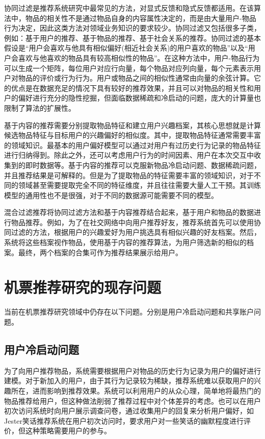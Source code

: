 协同过滤是推荐系统研究中最常见的方法，对显式反馈和隐式反馈都适用。在该算法中，物品的相关性不是通过物品自身的内容属性决定的，而是由大量用户-物品行为决定，因此这类方法对领域业务知识的要求较少。协同过滤又包括很多子类，例如：基于用户的推荐\cite{babu2011implementation}、基于物品的推荐\cite{sarwar2001item,linden2003amazon}、基于社会关系的推荐\cite{asabere2015socially,massa2007trust}。协同过滤的基本假设是“用户会喜欢与他具有相似偏好(相近社会关系)的用户喜欢的物品”以及“用户会喜欢与他喜欢的物品具有较高相似性的物品”。在这种方法中，用户-物品行为可以生成一个矩阵，每位用户对应行向量，每个物品对应列向量，每个元素表示用户对物品的评价或行为行为。用户或物品之间的相似性通常由向量的余弦\cite{goshtasby2012similarity}计算。它的优点是在数据充足的情况下具有较好的推荐效果，并且可以对物品的相关性和用户的偏好进行充分的隐性挖掘，但面临数据稀疏和冷启动的问题，庞大的计算量也限制了算法的扩展性。
		
基于内容的推荐需要分别提取物品特征和建立用户兴趣档案，其核心思想就是计算候选物品特征与目标用户的兴趣偏好的相似度。其中，提取物品特征通常需要丰富的领域知识。最基本的用户偏好模型可以通过对用户有过历史行为记录的物品特征进行归纳得到。除此之外，还可以考虑用户行为的时间因素、用户在本次交互中收集到的即时数据等。基于内容的推荐可以克服新物品冷启动问题、数据稀疏问题，并且推荐结果是可解释的。但是为了提取物品的特征需要丰富的领域知识，对于不同的领域甚至需要提取完全不同的特征维度，并且往往需要大量人工干预。其训练模型的通用性也不是很强，对于不同的数据源可能需要不同的模型。

混合过滤推荐将协同过滤方法和基于内容推荐结合起来，基于用户和物品的数据进行物品推荐。例如，为了在社交网络中向用户推荐好友\cite{portugal2015use}，推荐系统首先可以使用协同过滤的方法，根据用户的兴趣爱好为用户挑选具有相似兴趣的好友档案。然后，系统将这些档案视作物品，使用基于内容的推荐算法，为用户筛选新的相似的档案。最终，两个档案的合集可作为推荐结果展示给用户。

\section{机票推荐研究的现存问题}


当前在机票推荐研究领域中仍存在以下问题。分别是用户冷启动问题\cite{schein2002methods}和共享账户问题\cite{weston2013nonlinear}。

\subsection{用户冷启动问题}

为了向用户推荐物品，系统需要根据用户对物品的历史行为记录为用户的偏好进行建模。对于新加入的用户，由于其行为记录较为稀缺，推荐系统难以获取用户的兴趣所在，进而影响到推荐效果。系统可以利用用户的从众心理，简单地将最热门\cite{sun2012survey}的物品推荐给用户，但这种做法削弱了推荐过程中对个体差异的考虑。也可以在用户初次访问系统时向用户展示调查问卷，通过收集用户的回复来分析用户偏好，如Jester\cite{goldberg2001eigentaste}笑话推荐系统在用户初次访问时，要求用户对一些笑话的幽默程度进行评价，但这种策略需要用户的参与。

